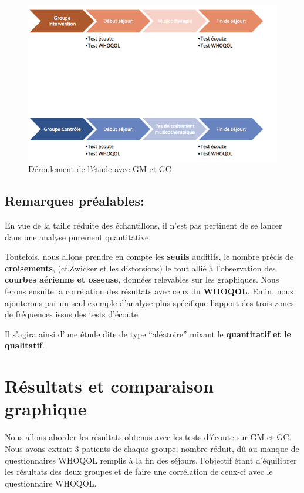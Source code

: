 \begin{figure}[hb]
\centering
\includegraphics[width=0.7\linewidth]{images/Groupecontrole.png}
\caption[Schéma du déroulement]{Déroulement de l'étude avec GM et GC}
       
\label{groupecontroleimage1}
\end{figure}




\subsection{Remarques préalables: }
En vue de la taille réduite des échantillons, il n'est pas
pertinent de se lancer dans une analyse purement
quantitative.

Toutefois, nous 
allons prendre en compte les \textbf{seuils} auditifs, le nombre précis de
\textbf{croisements}, (cf.Zwicker et les distorsions)
 le tout allié à l'observation 
des \textbf{courbes aérienne et osseuse}, 
données relevables sur les
graphiques.
Nous ferons ensuite la corrélation des résultats avec ceux du\textbf{ WHOQOL}.
Enfin, nous ajouterons par un seul exemple d'analyse plus spécifique l'apport des trois zones de fréquences issus des tests d'écoute.

Il s'agira  ainsi d'une étude dite de type  ``aléatoire'' mixant le \textbf{quantitatif  et le qualitatif}.



\section{Résultats et comparaison graphique }
Nous allons aborder les résultats obtenus avec les tests d'écoute sur
GM et GC.
Nous avons extrait 3 patients de chaque groupe, nombre réduit, dû au
manque de questionnaires WHOQOL remplis à la fin des séjours, l'objectif
étant d'équilibrer les résultats des deux groupes et de faire une corrélation de ceux-ci avec le questionnaire
WHOQOL.

